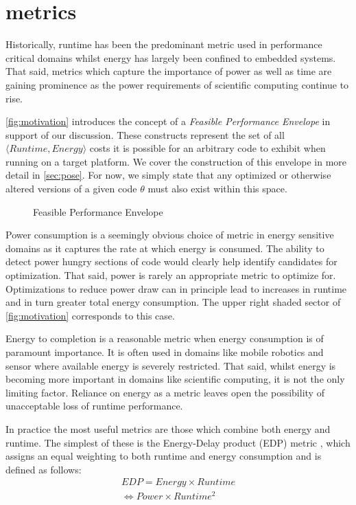 \section{metrics}
\label{sec:metrics}
Historically, runtime has been the predominant metric used in performance critical domains whilst energy has largely been confined to embedded systems.
That said, metrics which capture the importance of power as well as time are gaining prominence as the power requirements of scientific computing continue to rise.

\autoref{fig:motivation} introduces the concept of a \emph{Feasible Performance Envelope} in support of our discussion.
These constructs represent the set of all $\langle Runtime, Energy\rangle$ costs it is possible for an arbitrary code to exhibit when running on a target platform.
We cover the construction of this envelope in more detail in \autoref{sec:pose}.
For now, we simply state that any optimized or otherwise altered versions of a given code $\theta$ must also exist within this space.

\begin{figure}
\centering

\caption{Feasible Performance Envelope}
\label{fig:motivation}
\end{figure}

Power consumption is a seemingly obvious choice of metric in energy sensitive domains as it captures the rate at which energy is consumed.
The ability to detect power hungry sections of code would clearly help identify candidates for optimization.
That said, power is rarely an appropriate metric to optimize for.
Optimizations to reduce power draw can in principle lead to increases in runtime and in turn greater total energy consumption.
The upper right shaded sector of \autoref{fig:motivation} corresponds to this case.

Energy to completion is a reasonable metric when energy consumption is of paramount importance.
It is often used in domains like mobile robotics and sensor where available energy is severely restricted.
That said, whilst energy is becoming more important in domains like scientific computing, it is not the only limiting factor. 
Reliance on energy as a metric leaves open the possibility of unacceptable loss of runtime performance.

In practice the most useful metrics are those which combine both energy and runtime.
The simplest of these is the Energy-Delay product (EDP) metric \cite{gonzales:1995aa}, which assigns an equal weighting to both runtime and energy consumption and is defined as follows:
\begin{align}
  EDP = Energy \times Runtime \nonumber \\
      \Leftrightarrow Power \times Runtime^{2} 
  \label{eq:edp}
\end{align}

